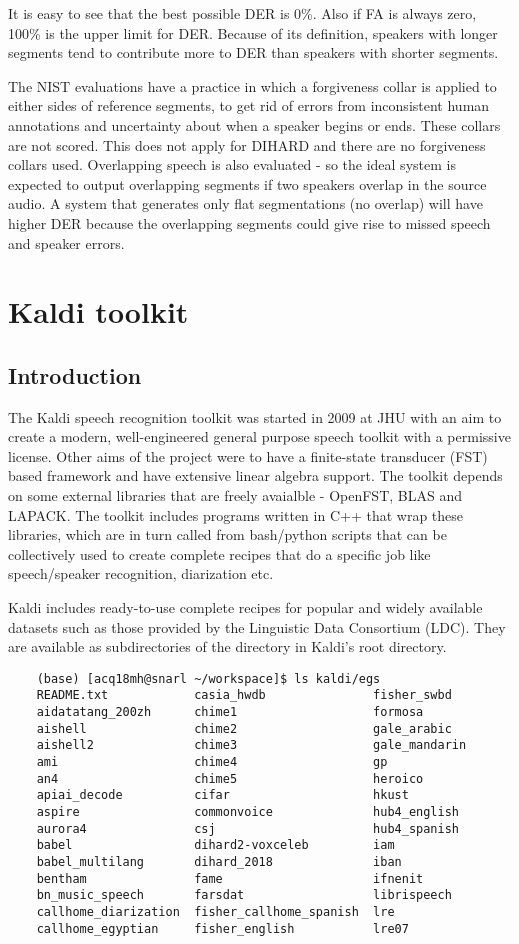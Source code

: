 		It is easy to see that the best possible DER is 0\%. Also if FA is always zero, 100\% is the upper limit for DER. Because of its definition, speakers with longer segments tend to contribute more to DER than speakers with shorter segments.
		
		The NIST evaluations have a practice in which a forgiveness collar is applied to either sides of reference segments, to get rid of errors from inconsistent human annotations and uncertainty about when a speaker begins or ends. These collars are not scored. This does not apply for DIHARD and there are no forgiveness collars used. Overlapping speech is also evaluated - so the ideal system is expected to output overlapping segments if two speakers overlap in the source audio. A system that generates only flat segmentations (no overlap) will have higher DER because the overlapping segments could give rise to missed speech and speaker errors.

\section{Kaldi toolkit}
	\subsection{Introduction}
	The Kaldi speech recognition toolkit was started in 2009 at JHU with an aim to create a modern, well-engineered general purpose speech toolkit with a permissive license. Other aims of the project were to have a finite-state transducer (FST) based framework and have extensive linear algebra support. The toolkit depends on some external libraries that are freely avaialble - OpenFST, BLAS and LAPACK. The toolkit includes programs written in C++ that wrap these libraries, which are in turn called from bash/python scripts that can be collectively used to create complete recipes that do a specific job like speech/speaker recognition, diarization etc.
	
	Kaldi includes ready-to-use complete recipes for popular and widely available datasets such as those provided by the Linguistic Data Consortium (LDC). They are available as subdirectories of the  directory in Kaldi's root directory.
	
	\begin{verbatim}
	(base) [acq18mh@snarl ~/workspace]$ ls kaldi/egs
	README.txt            casia_hwdb               fisher_swbd
	aidatatang_200zh      chime1                   formosa
	aishell               chime2                   gale_arabic
	aishell2              chime3                   gale_mandarin
	ami                   chime4                   gp
	an4                   chime5                   heroico
	apiai_decode          cifar                    hkust
	aspire                commonvoice              hub4_english
	aurora4               csj                      hub4_spanish
	babel                 dihard2-voxceleb         iam
	babel_multilang       dihard_2018              iban
	bentham               fame                     ifnenit
	bn_music_speech       farsdat                  librispeech
	callhome_diarization  fisher_callhome_spanish  lre
	callhome_egyptian     fisher_english           lre07
	\end{verbatim}
	
